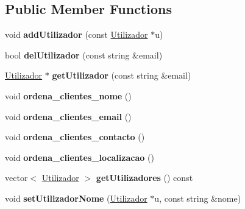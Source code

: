 \subsection*{Public Member Functions}
\begin{DoxyCompactItemize}
\item 
\hypertarget{class_utilizadores_a8da297a5a8081ff447fd48d12e1cb7ff}{}void {\bfseries add\+Utilizador} (const \hyperlink{class_utilizador}{Utilizador} $\ast$u)\label{class_utilizadores_a8da297a5a8081ff447fd48d12e1cb7ff}

\item 
\hypertarget{class_utilizadores_a3fb87e731cb7e37d3ffe856719dda3ba}{}bool {\bfseries del\+Utilizador} (const string \&email)\label{class_utilizadores_a3fb87e731cb7e37d3ffe856719dda3ba}

\item 
\hypertarget{class_utilizadores_aff713ff5b3d56f11938cc284ada8d560}{}\hyperlink{class_utilizador}{Utilizador} $\ast$ {\bfseries get\+Utilizador} (const string \&email)\label{class_utilizadores_aff713ff5b3d56f11938cc284ada8d560}

\item 
\hypertarget{class_utilizadores_a5f8f1ad34c616c61dc5cb88e22ff0d2b}{}void {\bfseries ordena\+\_\+clientes\+\_\+nome} ()\label{class_utilizadores_a5f8f1ad34c616c61dc5cb88e22ff0d2b}

\item 
\hypertarget{class_utilizadores_a20ed12421af513ceb5531827c62e7dd1}{}void {\bfseries ordena\+\_\+clientes\+\_\+email} ()\label{class_utilizadores_a20ed12421af513ceb5531827c62e7dd1}

\item 
\hypertarget{class_utilizadores_ad2ea7411adf690dad2248d714778de20}{}void {\bfseries ordena\+\_\+clientes\+\_\+contacto} ()\label{class_utilizadores_ad2ea7411adf690dad2248d714778de20}

\item 
\hypertarget{class_utilizadores_a0781d79b1ec4f6e728bcac527edd8940}{}void {\bfseries ordena\+\_\+clientes\+\_\+localizacao} ()\label{class_utilizadores_a0781d79b1ec4f6e728bcac527edd8940}

\item 
\hypertarget{class_utilizadores_a65fb5a7ede8ca454d5c33de34cacb19b}{}vector$<$ \hyperlink{class_utilizador}{Utilizador} $>$ {\bfseries get\+Utilizadores} () const \label{class_utilizadores_a65fb5a7ede8ca454d5c33de34cacb19b}

\item 
\hypertarget{class_utilizadores_af5033862d6d7afa7a20c018f86e66753}{}void {\bfseries set\+Utilizador\+Nome} (\hyperlink{class_utilizador}{Utilizador} $\ast$u, const string \&nome)\label{class_utilizadores_af5033862d6d7afa7a20c018f86e66753}


\end{DoxyCompactItemize}
